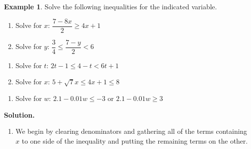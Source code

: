 \documentclass[11pt]{article}
\theoremstyle{definition}  %
\newtheorem{ex}{\bf Example}[section]
\newcounter{HW}
\begin{document}
\begin{ex}\label{linearineqreview}  Solve the following inequalities for the indicated variable. 

\begin{multicols}{2}

\begin{enumerate}

\item  Solve for $x$: $\dfrac{7-8x}{2} \geq 4x + 1$

\item  Solve for $y$: $\dfrac{3}{4} \leq \dfrac{7-y}{2} < 6$

\setcounter{HW}{\value{enumi}}

\end{enumerate}

\end{multicols}

\begin{multicols}{2}

\begin{enumerate}

\setcounter{enumi}{\value{HW}}

\item  Solve for $t$:  $2t-1 \leq 4-t < 6t+1$

\item  Solve for $x$: $5 + \sqrt{7} x \leq 4x + 1 \leq 8$


\setcounter{HW}{\value{enumi}}

\end{enumerate}

\end{multicols}

\begin{enumerate}
\setcounter{enumi}{\value{HW}}

\item  Solve for $w$: $2.1 - 0.01w \leq -3$ or $2.1-0.01w \geq 3$


\end{enumerate}

{\bf Solution.}

\begin{enumerate}

\item  We begin by clearing denominators and gathering all of the terms containing $x$ to one side of the inequality and putting the remaining terms on the other.\[ \begin{array}{rclr}


\end{array}\]
\end{enumerate}
\end{ex}
\end{document}
